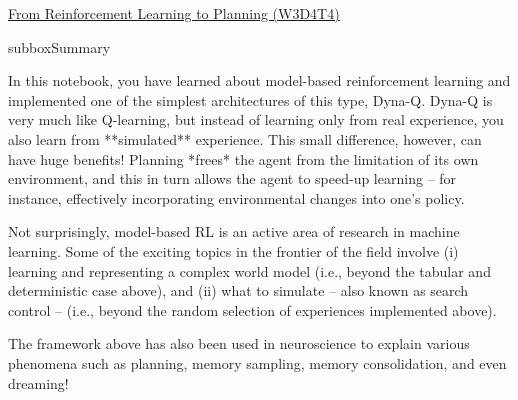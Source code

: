 \begin{textbox}{\href{https://compneuro.neuromatch.io/tutorials/W3D4_ReinforcementLearning/student/W3D4_Tutorial4.html}{From Reinforcement Learning to Planning (W3D4T4)} }
\begin{subbox}{subbox}{Summary}
\scriptsize

In this notebook, you have learned about model-based reinforcement learning and implemented one of the simplest architectures of this type, Dyna-Q. Dyna-Q is very much like Q-learning, but instead of learning only from real experience, you also learn from **simulated** experience. This small difference, however, can have huge benefits! Planning *frees* the agent from the limitation of its own environment, and this in turn allows the agent to speed-up learning -- for instance, effectively incorporating environmental changes into one's policy.

Not surprisingly, model-based RL is an active area of research in machine learning. Some of the exciting topics in the frontier of the field involve (i) learning and representing a complex world model (i.e., beyond the tabular and deterministic case above), and (ii) what to simulate -- also known as search control -- (i.e., beyond the random selection of experiences implemented above).

The framework above has also been used in neuroscience to explain various phenomena such as planning, memory sampling, memory consolidation, and even dreaming!

\end{subbox}
\end{textbox}